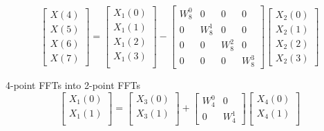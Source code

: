\documentclass[journal,12pt,twocolumn]{IEEEtran}
\renewcommand\thesection{\arabic{section}}
\begin{document}
\begin{enumerate}[label=\arabic*.,ref=\thesection.\theenumi]
	\begin{equation}
		\begin{bmatrix}
			X(4) \\ 
			X(5) \\ 
			X(6) \\ 
			X(7)
		\end{bmatrix}
		=
		\begin{bmatrix}
			X_{1}(0) \\ 
			X_{1}(1)\\ 
			X_{1}(2)\\
			X_{1}(3)\\
		\end{bmatrix}
		-
		\begin{bmatrix}
			W^{0}_{8} & 0 & 0 & 0\\
			0 & W^{1}_{8} & 0 & 0\\
			0 & 0 & W^{2}_{8} & 0\\
			0 & 0 & 0 & W^{3}_{8}
		\end{bmatrix}
		\begin{bmatrix}
			X_{2}(0) \\ 
			X_{2}(1) \\ 
			X_{2}(2) \\
			X_{2}(3)
		\end{bmatrix}
	\end{equation}
	
	4-point FFTs into 2-point FFTs
	\begin{equation}
		\begin{bmatrix}
			X_{1}(0) \\ 
			X_{1}(1)\\ 
		\end{bmatrix}
		=
		\begin{bmatrix}
			X_{3}(0) \\ 
			X_{3}(1)\\ 
		\end{bmatrix}
		+
		\begin{bmatrix}
			W^{0}_{4} & 0\\
			0 & W^{1}_{4}
		\end{bmatrix}
		\begin{bmatrix}
			X_{4}(0) \\ 
			X_{4}(1) \\ 
		\end{bmatrix}
	\end{equation}
	

\end{enumerate}
\end{document}
